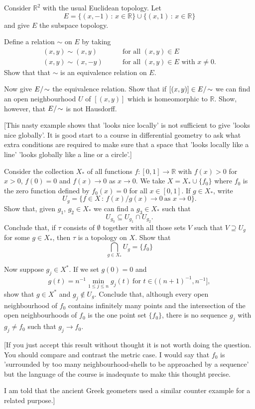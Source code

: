 \begin{problem}\label{E;nasty line}
Consider ${\mathbb R}^{2}$
with the usual Euclidean topology.
Let
\[E=\{(x,-1)\,:\,x\in{\mathbb R}\}\cup
\{(x,1)\,:\,x\in{\mathbb R}\}\]
and give $E$ the subspace topology.

Define a relation $\sim$ on $E$ by taking
\begin{align*}
(x,y)\sim(x,y)&\qquad\text{for all $(x,y)\in E$}\\
(x,y)\sim(x,-y)&\qquad\text{for all $(x,y)\in E$ with $x\neq 0$}.
\end{align*}
Show that that $\sim$ is an equivalence relation on $E$.

Now give $E/\negthinspace\sim$ the equivalence relation. Show
that if $[(x,y)]\in E/\negthinspace\sim$ we can find an open neighbourhood
$U$ of $[(x,y)]$ which is homeomorphic to ${\mathbb R}$.
Show, however, that $E/\negthinspace\sim$ is not Hausdorff.

[This nasty example shows that 'looks nice locally'
is not sufficient to give 'looks nice globally'.
It is good start to a course in differential geometry
to ask what extra conditions are required to make
sure that a space that 'looks locally like a line'
'looks globally like a line or a circle'.]
\end{problem}
\begin{problem}\label{E;large set}
Consider the collection $X_{*}$ of all
functions
$f:[0,1]\rightarrow{\mathbb R}$ with $f(x)>0$ for $x>0$,
$f(0)=0$ and $f(x)\rightarrow 0$ as $x\rightarrow 0$.
We take $X=X_{*}\cup\{f_{0}\}$ where $f_{0}$ is
the zero function
defined by $f_{0}(x)=0$ for all $x\in [0,1]$.
If $g\in X_{*}$, write
\[U_{g}=\{f\in X\,:\, f(x)/g(x)\rightarrow 0
\ \text{as $x\rightarrow 0$}\}.\]
Show that, given  $g_{1},\,g_{2}\in X_{*}$ we can find
a $g_{3}\in X_{*}$ such that
\[U_{g_{3}}\subseteq U_{g_{1}}\cap U_{g_{2}}.\]
Conclude that, if $\tau$ consists of $\emptyset$ together
with all those sets $V$ such that $V\supseteq U_{g}$ for
some $g\in X_{*}$, then $\tau$ is a topology on $X$.
Show that
\[\bigcap_{g\in X_{*}}U_{g}=\{f_{0}\}\]

Now suppose $g_{j}\in X^{*}$.
If we set $g(0)=0$ and
\[g(t)=n^{-1}\min_{1\leq j\leq n}g_{j}(t)
\ \text{for $t\in\big((n+1)^{-1},n^{-1}\big]$},\]
show that $g\in X^{*}$ and $g_{j}\notin U_{g}$.
Conclude that, although every open neighbourhood
of $f_{0}$ contains infinitely many points
and the intersection of the open neighbourhoods of
$f_{0}$ is the one point set $\{f_{0}\}$, there is no sequence
$g_{j}$ with $g_{j}\neq f_{0}$ such that
$g_{j}\rightarrow f_{0}$.

[If you just accept this result without thought it
is not worth doing the question. You should compare
and contrast the metric case. I would say that $f_{0}$
is 'surrounded by too many neighbourhood-shells to be approached
by a sequence' but the language of the course is inadequate
to make this thought precise.

I am told that the ancient Greek geometers used a similar
counter example for a related purpose.]
\end{problem}

